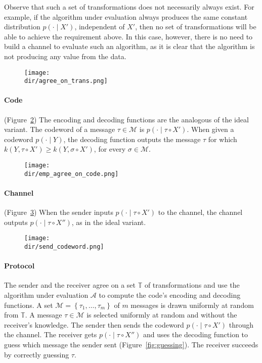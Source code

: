 Observe that such a set of transformations does not necessarily always exist. For example, if the algorithm under evaluation always produces the same constant distribution $p(\cdot \mid X')$, independent of $X'$, then no set of transformations will be able to achieve the requirement above. In this case, however, there is no need to build a channel to evaluate such an algorithm, as it is clear that the algorithm is not producing any value from the data.

\begin{figure}
\texttt{[image: \\dir/agree\_on\_trans.png]}
\caption{}
\label{fig:agree_on_trans}
\end{figure}

\paragraph{Code} (Figure~\ref{fig:emp_agree_on_code}) The encoding and decoding functions are the analogous of the ideal variant. The codeword of a message $\tau \in \mathcal{M}$ is $p(\cdot \mid \tau \circ X')$. When given a codeword $p(\cdot \mid Y)$, the decoding function outputs the message $\tau$ for which $k\left(Y, \tau \circ X'\right) \geq k\left(Y, \sigma \circ X'\right)$, for every $\sigma \in \mathcal{M}$.

\begin{figure}
\texttt{[image: \\dir/emp\_agree\_on\_code.png]}
\caption{}
\label{fig:emp_agree_on_code}
\end{figure}

\paragraph{Channel} (Figure~\ref{fig:send_codeword}) When the sender inputs $p(\cdot \mid \tau \circ X')$ to the channel, the channel outputs $p(\cdot \mid \tau \circ X'')$, as in the ideal variant.

\begin{figure}
\texttt{[image: \\dir/send\_codeword.png]}
\caption{}
\label{fig:send_codeword}
\end{figure}

\paragraph{Protocol} The sender and the receiver agree on a set $\mathbb{T}$ of transformations and use the algorithm under evaluation $\mathcal{A}$ to compute the code's encoding and decoding functions. A set $\mathcal{M} = \left\{\tau_1, \ldots, \tau_m\right\}$ of $m$ messages is drawn uniformly at random from $\mathbb{T}$. A message $\tau \in \mathcal{M}$ is selected uniformly at random and without the receiver's knowledge. The sender then sends the codeword $p(\cdot \mid \tau \circ X')$ through the channel. The receiver gets $p(\cdot \mid \tau \circ X'')$ and uses the decoding function to guess which message the sender sent (Figure~\ref{fig:guessing}). The receiver succeeds by correctly guessing $\tau$.

